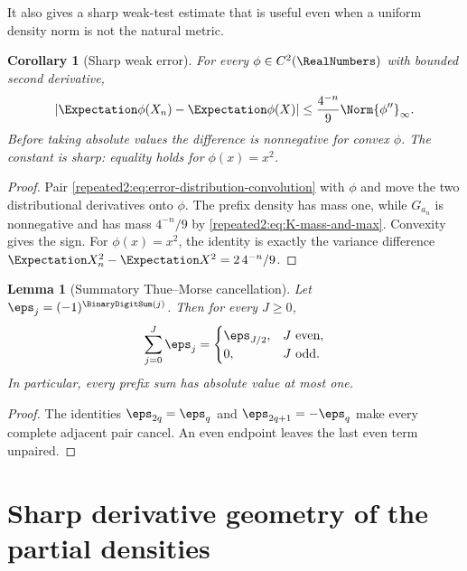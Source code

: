 \documentclass[11pt,oneside]{article}
\newtheorem{lemma}[lemma]{Lemma}
\newtheorem{corollary}[corollary]{Corollary}
\theoremstyle{definition}
\theoremstyle{remark}
\begin{document}
It also gives a sharp weak-test estimate that is useful even when a uniform density norm
is not the natural metric.

\begin{corollary}[Sharp weak error]
\label{repeated2:cor:weak-error}
For every $\phi\in C^2(\RealNumbers)$ with bounded second derivative,
\begin{equation}
 \left|\Expectation\phi(X_n)-\Expectation\phi(X)\right|
 \le \frac{4^{-n}}9\Norm{\phi''}_\infty.
 \label{repeated2:eq:weak-error}
\end{equation}
Before taking absolute values the difference is nonnegative for convex $\phi$.
The constant is sharp: equality holds for $\phi(x)=x^2$.
\end{corollary}

\begin{proof}
Pair \eqref{repeated2:eq:error-distribution-convolution} with $\phi$ and move the
two distributional derivatives onto $\phi$.  The prefix density has mass one, while
$G_{a_n}$ is nonnegative and has mass $4^{-n}/9$ by
\eqref{repeated2:eq:K-mass-and-max}.  Convexity gives the sign.  For $\phi(x)=x^2$,
the identity is exactly the variance difference
$\Expectation X_n^2-\Expectation X^2=2\,4^{-n}/9$.
\end{proof}

\begin{lemma}[Summatory Thue--Morse cancellation]
\label{repeated2:lem:TM-prefix}
Let $\eps_j=(-1)^{\BinaryDigitSum(j)}$.  Then for every $J\ge0$,
\begin{equation}
 \sum_{j=0}^{J}\eps_j=
 \begin{cases}
  \eps_{J/2},&J\text{ even},\\
  0,&J\text{ odd}.
 \end{cases}                                                \label{repeated2:eq:TM-prefix}
\end{equation}
In particular, every prefix sum has absolute value at most one.
\end{lemma}

\begin{proof}
The identities $\eps_{2q}=\eps_q$ and $\eps_{2q+1}=-\eps_q$ make every complete adjacent pair
cancel.  An even endpoint leaves the last even term unpaired.
\end{proof}

\section{Sharp derivative geometry of the partial densities}
\label{repeated2:sec:partial-density-geometry}
\end{document}
